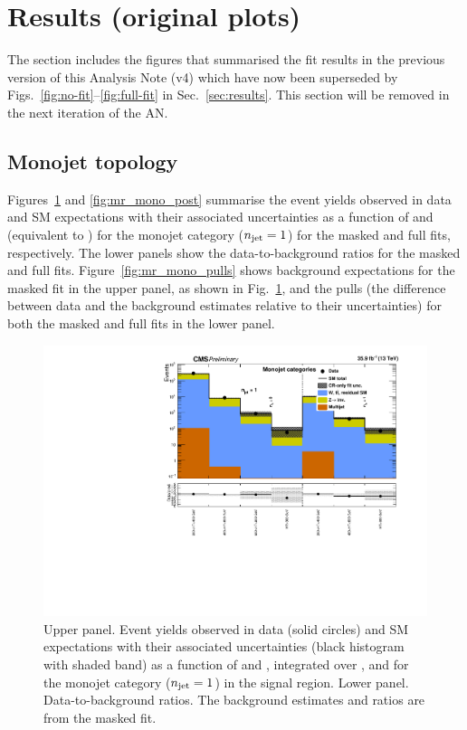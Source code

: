 \section{Results (original plots)}
\label{app:results-orig}

The section includes the figures that summarised the fit results in
the previous version of this Analysis Note (v4) which have now been
superseded by Figs.~\ref{fig:no-fit}--\ref{fig:full-fit} in
Sec.~\ref{sec:results}. This section will be removed in the next
iteration of the AN.

\subsection{Monojet topology}
\label{app:results-orig-mono}

Figures~\ref{fig:mr_mono_pre} and \ref{fig:mr_mono_post} summarise the
event yields observed in data and SM expectations with their
associated uncertainties as a function of \nb and \scalht (equivalent
to \mht) for the monojet category ($n_{\text{jet}} = 1$) for the masked and
full fits, respectively. The lower panels show the data-to-background
ratios for the masked and full fits.  Figure~\ref{fig:mr_mono_pulls}
shows background expectations for the masked fit in the upper panel,
as shown in Fig.~\ref{fig:mr_mono_pre}, and the pulls (\ie the
difference between data and the background estimates relative to their
uncertainties) for both the masked and full fits in the lower panel.

\clearpage
\begin{figure}[h!]
  \centering
  \caption{Upper panel. Event yields observed in data (solid circles)
    and SM expectations with their associated uncertainties (black
    histogram with shaded band) as a function of \nb and \scalht,
    integrated over \mht, and for the monojet category ($n_{\text{jet}} = 1$)
    in the signal region. Lower panel. Data-to-background ratios. The
    background estimates and ratios are from the masked fit. }
  \label{fig:mr_mono_pre}
  \includegraphics[width=1.\linewidth]{figures/results/36invfb_preapproval/mono/summaryPlot_Monojet_prefit}
\end{figure}

